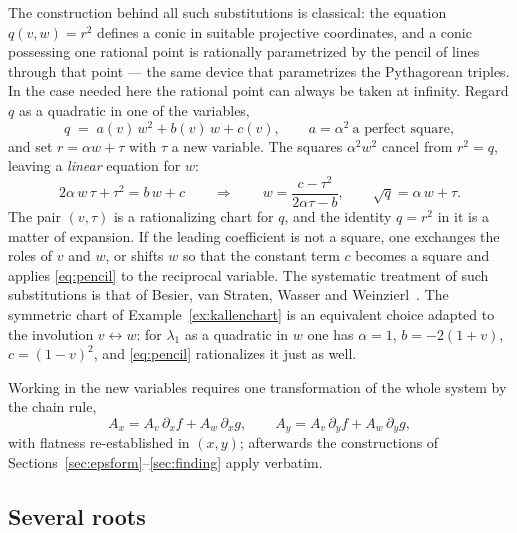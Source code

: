 \documentclass[11pt]{article}
\begin{document}
The construction behind all such substitutions is classical: the
equation $q(v,w) = r^2$ defines a conic in suitable projective
coordinates, and a conic possessing one rational point is rationally
parametrized by the pencil of lines through that point --- the same
device that parametrizes the Pythagorean triples.  In the case needed
here the rational point can always be taken at infinity.  Regard $q$
as a quadratic in one of the variables,
\begin{equation}
  q \;=\; a(v)\,w^2 + b(v)\,w + c(v) ,
  \qquad a = \alpha^2 \ \text{a perfect square} ,
\end{equation}
and set $r = \alpha w + \tau$ with $\tau$ a new variable.  The
squares $\alpha^2w^2$ cancel from $r^2 = q$, leaving a
\emph{linear} equation for $w$:
\begin{equation}
  2\alpha\,w\,\tau + \tau^2 = b\,w + c
  \qquad\Longrightarrow\qquad
  w = \frac{c - \tau^2}{2\alpha\tau - b},
  \qquad
  \sqrt q = \alpha\,w + \tau .
  \label{eq:pencil}
\end{equation}
The pair $(v,\tau)$ is a rationalizing chart for $q$, and the
identity $q = r^2$ in it is a matter of expansion.  If the leading
coefficient is not a square, one exchanges the roles of $v$ and $w$,
or shifts $w$ so that the constant term $c$ becomes a square and
applies \eqref{eq:pencil} to the reciprocal variable.  The systematic
treatment of such substitutions is that of Besier, van Straten,
Wasser and Weinzierl~\cite{besier}.
The symmetric chart of Example~\ref{ex:kallenchart} is an equivalent
choice adapted to the involution $v \leftrightarrow w$: for
$\lambda_1$ as a quadratic in $w$ one has $\alpha = 1$,
$b = -2(1+v)$, $c = (1-v)^2$, and \eqref{eq:pencil} rationalizes it
just as well.

Working in the new variables requires one transformation of the
whole system by the chain rule,
\begin{equation}
  A_x = A_v\,\partial_x f + A_w\,\partial_x g,
  \qquad
  A_y = A_v\,\partial_y f + A_w\,\partial_y g ,
\end{equation}
with flatness re-established in $(x,y)$; afterwards the
constructions of Sections~\ref{sec:epsform}--\ref{sec:finding}
apply verbatim.

\subsection{Several roots}
\end{document}

